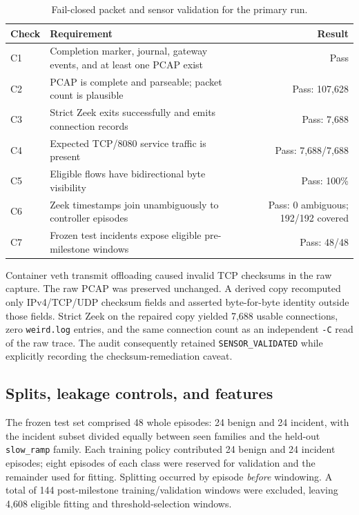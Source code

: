 \documentclass[10pt,a4paper]{article}
\newcommand{\sensorvalidated}{\texttt{SENSOR\_VALIDATED}}
\begin{document}
\begin{table}[H]
\centering
\caption{Fail-closed packet and sensor validation for the primary run.}
\small
\begin{tabularx}{\textwidth}{@{}p{9mm}Xr@{}}
\toprule
Check & Requirement & Result \\
\midrule
C1 & Completion marker, journal, gateway events, and at least one PCAP exist & Pass \\
C2 & PCAP is complete and parseable; packet count is plausible & Pass: 107,628 \\
C3 & Strict Zeek exits successfully and emits connection records & Pass: 7,688 \\
C4 & Expected TCP/8080 service traffic is present & Pass: 7,688/7,688 \\
C5 & Eligible flows have bidirectional byte visibility & Pass: 100\% \\
C6 & Zeek timestamps join unambiguously to controller episodes & Pass: 0 ambiguous; 192/192 covered \\
C7 & Frozen test incidents expose eligible pre-milestone windows & Pass: 48/48 \\
\bottomrule
\end{tabularx}
\label{tab:gate}
\end{table}

Container veth transmit offloading caused invalid TCP checksums in the raw capture. The raw PCAP was preserved unchanged. A derived copy recomputed only IPv4/TCP/UDP checksum fields and asserted byte-for-byte identity outside those fields. Strict Zeek on the repaired copy yielded 7,688 usable connections, zero \texttt{weird.log} entries, and the same connection count as an independent \texttt{-C} read of the raw trace. The audit consequently retained \sensorvalidated{} while explicitly recording the checksum-remediation caveat.

\subsection{Splits, leakage controls, and features}

The frozen test set comprised 48 whole episodes: 24 benign and 24 incident, with the incident subset divided equally between seen families and the held-out \texttt{slow\_ramp} family. Each training policy contributed 24 benign and 24 incident episodes; eight episodes of each class were reserved for validation and the remainder used for fitting. Splitting occurred by episode \emph{before} windowing. A total of 144 post-milestone training/validation windows were excluded, leaving 4,608 eligible fitting and threshold-selection windows.
\end{document}
